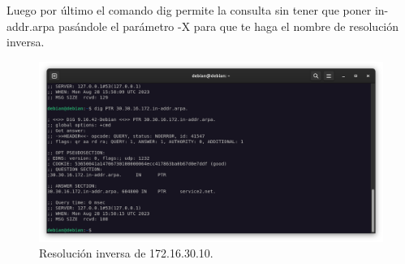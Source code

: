 Luego por último el comando dig permite la consulta sin tener que poner in-addr.arpa pasándole el parámetro -X para que te haga el nombre de resolución inversa.

\begin{figure}[H]
	\centering
	\includegraphics[scale=0.30]{14}
	\caption{Resolución inversa de 172.16.30.10.}
\end{figure}








%



%


